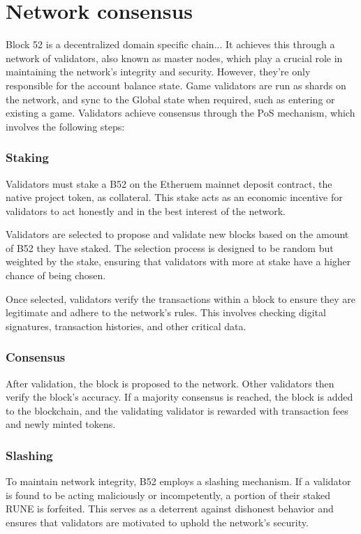 \documentclass{article}
\begin{document}
\section{Network consensus}
Block 52 is a decentralized domain specific chain... It achieves this through a network of validators, also known as master nodes, which play a crucial role in maintaining the network's integrity and security. However, they're only responsible for the account balance state.  Game validators are run as shards on the network, and sync to the Global state when required, such as entering or existing a game.  Validators achieve consensus through the PoS mechanism, which involves the following steps:

\subsubsection*{Staking}
Validators must stake a B52 on the Etheruem mainnet deposit contract, the native project token, as collateral. This stake acts as an economic incentive for validators to act honestly and in the best interest of the network.

Validators are selected to propose and validate new blocks based on the amount of B52 they have staked. The selection process is designed to be random but weighted by the stake, ensuring that validators with more at stake have a higher chance of being chosen.

Once selected, validators verify the transactions within a block to ensure they are legitimate and adhere to the network's rules. This involves checking digital signatures, transaction histories, and other critical data.

\subsubsection*{Consensus}
After validation, the block is proposed to the network. Other validators then verify the block's accuracy. If a majority consensus is reached, the block is added to the blockchain, and the validating validator is rewarded with transaction fees and newly minted tokens.

\subsubsection*{Slashing}
To maintain network integrity, B52 employs a slashing mechanism. If a validator is found to be acting maliciously or incompetently, a portion of their staked RUNE is forfeited. This serves as a deterrent against dishonest behavior and ensures that validators are motivated to uphold the network's security.
\end{document}
